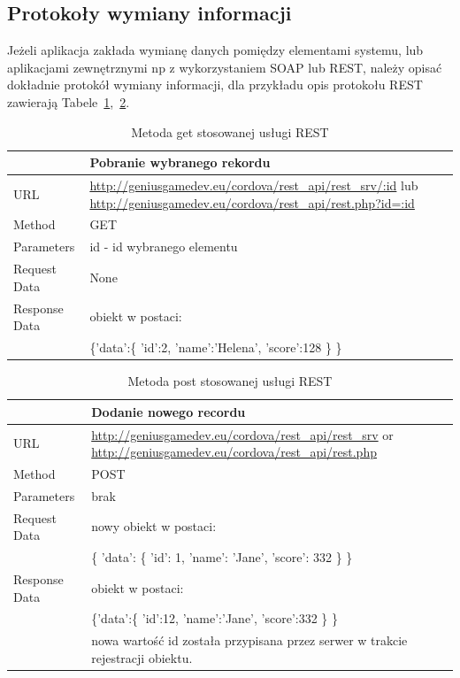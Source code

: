 \documentclass[12pt,a4paper]{article}
\begin{document}
\subsection{Protokoły wymiany informacji}
Jeżeli aplikacja zakłada wymianę danych pomiędzy elementami systemu, lub aplikacjami zewnętrznymi np z wykorzystaniem SOAP lub REST, należy opisać dokładnie protokół wymiany informacji, dla przykładu opis protokołu REST zawierają Tabele~\ref{rest1},~\ref{rest2}.

\begin{table}
\begin{tabularx}{\textwidth}{|l|X|}
\hline
&\textbf{Pobranie wybranego rekordu}\\\hline
URL &   \url{http://geniusgamedev.eu/cordova/rest_api/rest_srv/:id} lub \url{http://geniusgamedev.eu/cordova/rest_api/rest.php?id=:id}\\\hline
Method  & GET\\\hline
Parameters  & id - id wybranego elementu \\\hline
Request Data & None\\\hline
Response Data & obiekt w postaci:\\
&

\{'data':\{
    'id':2,
    'name':'Helena',
    'score':128
    \}
\}

\\\hline
\end{tabularx}
\caption{Metoda get stosowanej usługi REST}\label{rest1}
\end{table}

\begin{table}
\begin{tabularx}{\textwidth}{|l|X|}
\hline
&\textbf{Dodanie nowego recordu}\\\hline
URL &   \url{http://geniusgamedev.eu/cordova/rest_api/rest_srv} or \url{http://geniusgamedev.eu/cordova/rest_api/rest.php}\\\hline
Method  & POST\\\hline
Parameters  & brak \\\hline
Request Data & nowy obiekt w postaci:\\
&\{
'data': \{
'id': 1,
'name': 'Jane',
'score': 332
\}
\}
\\\hline
Response Data & obiekt w postaci:\\
&
\{'data':\{
    'id':12,
    'name':'Jane',
    'score':332
    \}
\}
\\
&nowa wartość id została przypisana przez serwer w trakcie rejestracji obiektu.
\\\hline
\end{tabularx}
\caption{Metoda post stosowanej usługi REST}\label{rest2}
\end{table}
\end{document}
